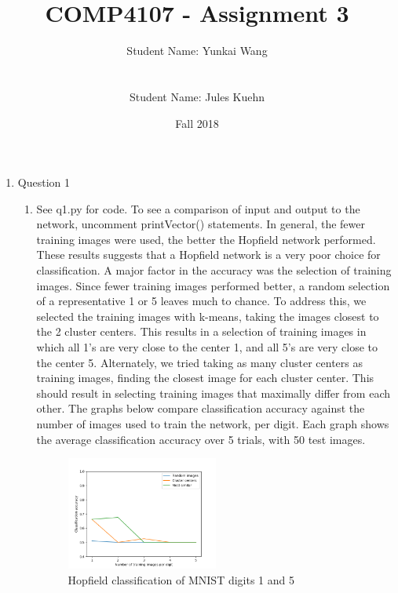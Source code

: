 \documentclass[11pt]{article}
\title{COMP4107 - Assignment 3}
\author{Student Name: Yunkai Wang\\
\text{Student Number: 100968473}\\\\
Student Name: Jules Kuehn\\
\text{Student Number: 100661464}}
\date{Fall 2018}
\begin{document}
\maketitle
\begin{enumerate}

\item Question 1
\begin{enumerate}
\item
See q1.py for code. To see a comparison of input and output to the network, uncomment printVector() statements.\newline
\newline
In general, the fewer training images were used, the better the Hopfield network performed. These results suggests that a Hopfield network is a very poor choice for classification.\newline
\newline
A major factor in the accuracy was the selection of training images. Since fewer training images performed better, a random selection of a representative 1 or 5 leaves much to chance. To address this, we selected the training images with k-means, taking the images closest to the 2 cluster centers. This results in a selection of training images in which all 1's are very close to the center 1, and all 5's are very close to the center 5. Alternately, we tried taking as many cluster centers as training images, finding the closest image for each cluster center. This should result in selecting training images that maximally differ from each other.\newline
\newline
The graphs below compare classification accuracy against the number of images used to train the network, per digit. Each graph shows the average classification accuracy over 5 trials, with 50 test images.
\begin{figure}[h!]
    \centering
     \includegraphics[width=0.5\textwidth]{q1_noStorkey}
        \caption{Hopfield classification of MNIST digits 1 and 5}
\end{figure}


\end{enumerate}
\end{enumerate}
\end{document}
